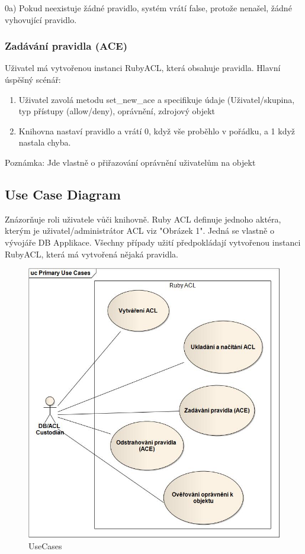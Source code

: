 \documentclass[11pt,twoside,a4paper]{book}
\begin{document}
0a) Pokud neexistuje žádné pravidlo, systém vrátí false, protože nenašel, žádné vyhovující pravidlo.

\subsubsection{Zadávání pravidla (ACE)}
Uživatel má vytvořenou instanci RubyACL, která obsahuje pravidla.
Hlavní úspěšný scénář:
\begin{enumerate}
\item Uživatel zavolá metodu set\_new\_ace a specifikuje údaje (Uživatel/skupina, typ přístupy (allow/deny), oprávnění, zdrojový objekt
\item Knihovna nastaví pravidlo a vrátí 0, když vše proběhlo v pořádku, a 1 když nastala chyba.
\end{enumerate}
Poznámka: Jde vlastně o přiřazování oprávnění uživatelům na objekt




\subsection{Use Case Diagram}
Znázorňuje roli uživatele vůči knihovně. Ruby ACL definuje jednoho aktéra, kterým je uživatel/administrátor ACL viz "Obrázek 1". Jedná se vlastně o vývojáře DB Applikace.
Všechny případy užití předpokládají vytvořenou instanci RubyACL, která má vytvořená nějaká pravidla.
\begin{figure}
\includegraphics[width=15cm]{UseCases.jpg}
\caption{UseCases}
\label{fig:UseCases}
\end{figure}
\end{document}
